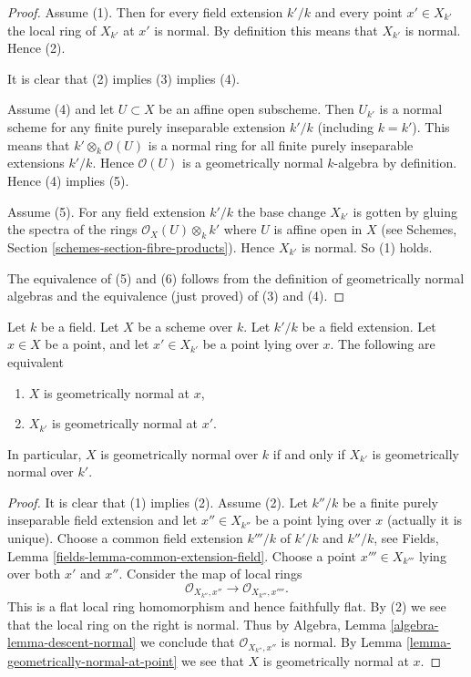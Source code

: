 \begin{proof}
Assume (1). Then for every field extension $k'/k$ and
every point $x' \in X_{k'}$ the local ring of $X_{k'}$ at $x'$
is normal. By definition this means that $X_{k'}$ is normal.
Hence (2).

\medskip\noindent
It is clear that (2) implies (3) implies (4).

\medskip\noindent
Assume (4) and let $U \subset X$ be an affine open subscheme.
Then $U_{k'}$ is a normal scheme for any finite purely inseparable
extension $k'/k$ (including $k = k'$). This means that
$k' \otimes_k \mathcal{O}(U)$ is a normal ring for all
finite purely inseparable extensions $k'/k$. Hence
$\mathcal{O}(U)$ is a geometrically normal $k$-algebra by definition.
Hence (4) implies (5).

\medskip\noindent
Assume (5). For any field extension $k'/k$ the base
change $X_{k'}$ is gotten by gluing the spectra of the
rings $\mathcal{O}_X(U) \otimes_k k'$ where $U$ is affine open
in $X$ (see Schemes, Section \ref{schemes-section-fibre-products}).
Hence $X_{k'}$ is normal. So (1) holds.

\medskip\noindent
The equivalence of (5) and (6) follows from the definition
of geometrically normal algebras and the equivalence (just proved)
of (3) and (4).
\end{proof}

\begin{lemma}
\label{lemma-geometrically-normal-upstairs}
Let $k$ be a field.
Let $X$ be a scheme over $k$.
Let $k'/k$ be a field extension.
Let $x \in X$ be a point, and let $x' \in X_{k'}$ be a point lying over $x$.
The following are equivalent
\begin{enumerate}
\item $X$ is geometrically normal at $x$,
\item $X_{k'}$ is geometrically normal at $x'$.
\end{enumerate}
In particular, $X$ is geometrically normal over $k$ if and only if
$X_{k'}$ is geometrically normal over $k'$.
\end{lemma}

\begin{proof}
It is clear that (1) implies (2). Assume (2).
Let $k''/k$ be a finite purely inseparable field extension
and let $x'' \in X_{k''}$ be a point lying over $x$ (actually it is
unique). Choose a common field extension $k'''/k$ of $k'/k$
and $k''/k$, see Fields, Lemma \ref{fields-lemma-common-extension-field}.
Choose a point $x''' \in X_{k'''}$ lying over both $x'$ and $x''$.
Consider the map of local rings
$$
\mathcal{O}_{X_{k''}, x''} \longrightarrow \mathcal{O}_{X_{k'''}, x''''}.
$$
This is a flat local ring homomorphism and hence faithfully flat.
By (2) we see that the local ring on the right is normal.
Thus by Algebra, Lemma \ref{algebra-lemma-descent-normal}
we conclude that $\mathcal{O}_{X_{k''}, x''}$ is normal.
By Lemma \ref{lemma-geometrically-normal-at-point} we see that $X$
is geometrically normal at $x$.
\end{proof}

